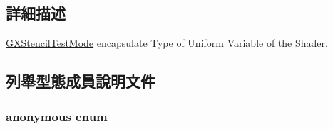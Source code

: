 \subsection{詳細描述}
\hyperlink{class_i_dream_sky_1_1_g_x_stencil_test_mode}{G\+X\+Stencil\+Test\+Mode} encapsulate Type of Uniform Variable of the Shader. 

\subsection{列舉型態成員說明文件}
\subsubsection[{\texorpdfstring{anonymous enum}{anonymous enum}}]{\setlength{\rightskip}{0pt plus 5cm}anonymous enum}\hypertarget{class_i_dream_sky_1_1_g_x_stencil_test_mode_a19e795f814b59e64cf9394fe9bd2a5f2}{}\label{class_i_dream_sky_1_1_g_x_stencil_test_mode_a19e795f814b59e64cf9394fe9bd2a5f2}
